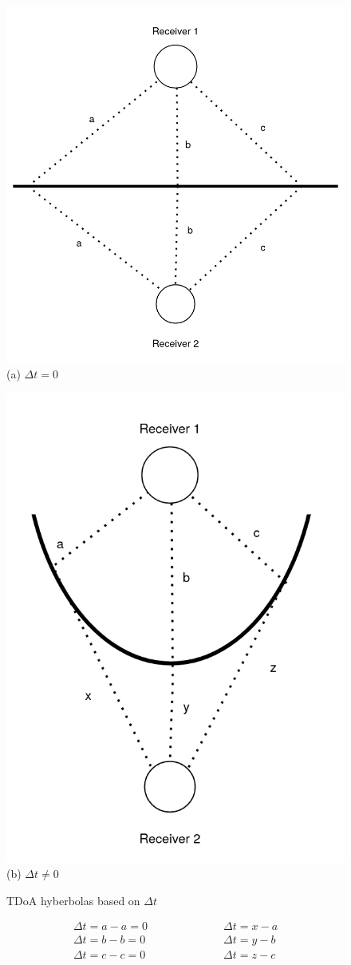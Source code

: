 \begin{figure} [H]
	\centering
    \begin{minipage}{.5\textwidth}
      \centering
      \includegraphics[width=0.6\linewidth]{../Photos/tdoa-dt-0.png}\\
      {(a) $Δt = 0$}
    \end{minipage}%
    \begin{minipage}{.5\textwidth}
      \centering
      \includegraphics[width=0.4\linewidth]{../Photos/tdoa-dt-not-0.png}\\
      {(b) $Δt \neq 0$}
	\end{minipage}
    \hfill \break
    \decoRule
    \caption[TDoA hyberbolas based on $\Delta t$]{TDoA hyberbolas based on $\Delta t$}
    \label{fig:TDoA-hyberbolas}
\end{figure}
\begin{align}
	\Delta t = a-a = 0 \quad \quad \quad & \quad \quad \quad\Delta t = x-a \nonumber \\
	\Delta t = b-b = 0 \quad \quad \quad & \quad \quad \quad\Delta t = y-b \nonumber \\
	\Delta t = c-c = 0 \quad \quad \quad & \quad \quad \quad\Delta t = z-c \nonumber
\end{align}


